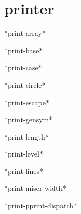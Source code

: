 \section{printer}

\begin{variable}{*print-array*}{}{}
  
\end{variable}

\begin{variable}{*print-base*}{}{}
  
\end{variable}

\begin{variable}{*print-case*}{}{}
  
\end{variable}

\begin{variable}{*print-circle*}{}{}
  
\end{variable}

\begin{variable}{*print-escape*}{}{}
  
\end{variable}

\begin{variable}{*print-gensym*}{}{}
  
\end{variable}

\begin{variable}{*print-length*}{}{}
  
\end{variable}

\begin{variable}{*print-level*}{}{}
  
\end{variable}

\begin{variable}{*print-lines*}{}{}
  
\end{variable}

\begin{variable}{*print-miser-width*}{}{}
  
\end{variable}

\begin{variable}{*print-pprint-dispatch*}{}{}
  
\end{variable}

